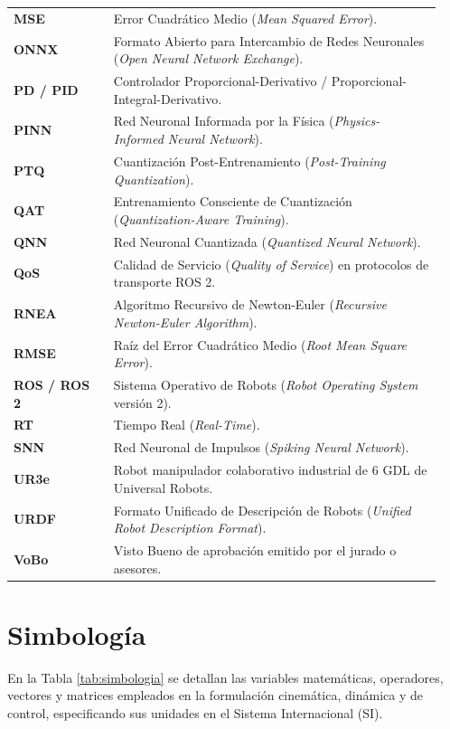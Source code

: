 \documentclass[12pt]{article}
\begin{document}
\begin{longtable}{p{0.22\linewidth} p{0.72\linewidth}}
\textbf{MSE} & Error Cuadrático Medio (\textit{Mean Squared Error}). \\
\textbf{ONNX} & Formato Abierto para Intercambio de Redes Neuronales (\textit{Open Neural Network Exchange}). \\
\textbf{PD / PID} & Controlador Proporcional-Derivativo / Proporcional-Integral-Derivativo. \\
\textbf{PINN} & Red Neuronal Informada por la Física (\textit{Physics-Informed Neural Network}). \\
\textbf{PTQ} & Cuantización Post-Entrenamiento (\textit{Post-Training Quantization}). \\
\textbf{QAT} & Entrenamiento Consciente de Cuantización (\textit{Quantization-Aware Training}). \\
\textbf{QNN} & Red Neuronal Cuantizada (\textit{Quantized Neural Network}). \\
\textbf{QoS} & Calidad de Servicio (\textit{Quality of Service}) en protocolos de transporte ROS 2. \\
\textbf{RNEA} & Algoritmo Recursivo de Newton-Euler (\textit{Recursive Newton-Euler Algorithm}). \\
\textbf{RMSE} & Raíz del Error Cuadrático Medio (\textit{Root Mean Square Error}). \\
\textbf{ROS / ROS 2} & Sistema Operativo de Robots (\textit{Robot Operating System} versión 2). \\
\textbf{RT} & Tiempo Real (\textit{Real-Time}). \\
\textbf{SNN} & Red Neuronal de Impulsos (\textit{Spiking Neural Network}). \\
\textbf{UR3e} & Robot manipulador colaborativo industrial de 6 GDL de Universal Robots. \\
\textbf{URDF} & Formato Unificado de Descripción de Robots (\textit{Unified Robot Description Format}). \\
\textbf{VoBo} & Visto Bueno de aprobación emitido por el jurado o asesores. \\
\end{longtable}

\newpage
\section*{Simbología}

En la Tabla \ref{tab:simbologia} se detallan las variables matemáticas, operadores, vectores y matrices empleados en la formulación cinemática, dinámica y de control, especificando sus unidades en el Sistema Internacional (SI).
\end{document}
